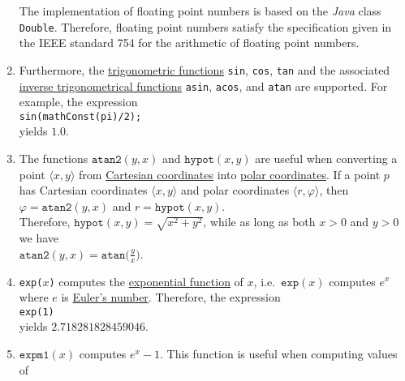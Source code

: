 \begin{enumerate}
      The implementation of floating point numbers is based on the \textsl{Java} class
      \texttt{Double}.  Therefore, floating point numbers satisfy the specification given in the
      IEEE standard 754 for the arithmetic of floating point numbers.
\item Furthermore, the 
      \href{https://en.wikipedia.org/wiki/Trigonometric_functions}{trigonometric functions} 
      \texttt{sin}, \texttt{cos}, \texttt{tan} and the associated 
      \href{https://en.wikipedia.org/wiki/Inverse_trigonometric_functions}{inverse trigonometrical functions}
      \texttt{asin}, \texttt{acos}, and \texttt{atan}
      are supported.  For example, the expression
      \\[0.2cm]
      \hspace*{1.3cm}
      \texttt{sin(mathConst(pi)/2);}
      \\[0.2cm]
      yields $1.0$.
\item The functions $\texttt{atan2}(y,x)$ and $\texttt{hypot}(x,y)$ are useful when converting 
      a point $\langle x, y \rangle$ from
      \href{https://en.wikipedia.org/wiki/Cartesian_coordinate_system}{Cartesian coordinates} 
      into \href{https://en.wikipedia.org/wiki/Polar_coordinate_system}{polar coordinates}.  If a
      point $p$ has Cartesian coordinates $\langle x, y \rangle$ and polar coordinates 
      $\langle r, \varphi \rangle$, then 
      \\[0.2cm]
      \hspace*{1.3cm}
      $\varphi = \mathtt{atan2}(y,x)$ \quad and \quad $r = \mathtt{hypot}(x, y)$.
      \\[0.2cm]
      Therefore, $\texttt{hypot}(x,y) = \sqrt{x^2 + y^2}$, while as long as both $x > 0$ and $y > 0$
      we have
      \\[0.2cm]
      \hspace*{1.3cm}
      $\mathtt{atan2}(y,x) = \mathtt{atan}\bigl(\frac{y}{x}\bigr)$.
\item \texttt{exp($x$)} computes the
      \href{https://en.wikipedia.org/wiki/Exponential_function}{exponential function} of $x$, 
      i.e.~$\mathtt{exp}(x)$ computes $e^x$ where $e$ is 
      \href{https://en.wikipedia.org/wiki/E_(mathematical_constant)}{Euler's number}.  Therefore, the
      expression 
      \\[0.2cm]
      \hspace*{1.3cm}
      \texttt{exp(1)}
      \\[0.2cm]
      yields $2.718281828459046$.
\item $\texttt{expm1}(x)$ computes $e^x - 1$.  This function is useful when computing values of

\end{enumerate}
